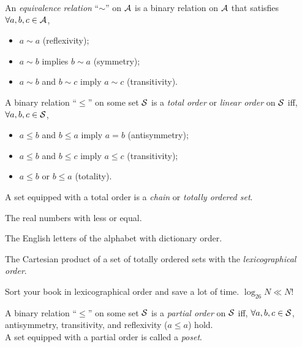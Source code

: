 \begin{defn}
  An \emph{equivalence relation} ``$\sim$'' on ${\cal A}$ is 
  a binary relation on ${\cal A}$ 
  that satisfies
  $\forall a,b,c\in{\cal A}$,
  \begin{itemize}
    \itemsep0em
  \item $a\sim a$ (reflexivity);
  \item $a\sim b$ implies $b\sim a$ (symmetry);
  \item $a\sim b$ and $b\sim c$ imply $a\sim c$ (transitivity).
  \end{itemize}
\end{defn}

\begin{defn}
  \label{defn:totalOrder}
  A binary relation ``$\le$'' on some set ${\cal S}$
  is a \emph{total order} or \emph{linear order} on ${\cal S}$
  iff,
  $\forall a,b,c\in{\cal S}$,
  \begin{itemize}
  \item $a\le b$ and $b\le a$ imply $a=b$ (antisymmetry);
  \item $a\le b$ and $b\le c$ imply $a\le c$ (transitivity);
  \item $a\le b$ or $b\le a$ (totality).
  \end{itemize}
  A set equipped with a total order
  is a \emph{chain} or \emph{totally ordered set}.
\end{defn}

\begin{exm}
  The real numbers with less or equal.
\end{exm}

\begin{exm}
  The English letters of the alphabet with dictionary order.
\end{exm}

\begin{exm}
  The Cartesian product of a set of totally ordered sets
  with the \emph{lexicographical order}.
\end{exm}

\begin{exm}
  Sort your book in lexicographical order
  and save a lot of time.
  $\log_{26}N \ll N$!
\end{exm}

\begin{defn}
  \label{def:partialOrderAndPoset}
  A binary relation ``$\le$'' on some set ${\cal S}$
  is a \emph{partial order} on ${\cal S}$
  iff, $\forall a,b,c\in{\cal S}$,
  antisymmetry, transitivity, and reflexivity ($a\le a$)
  hold.\\
  A set equipped with a partial order
  is called a \emph{poset}.
\end{defn}

